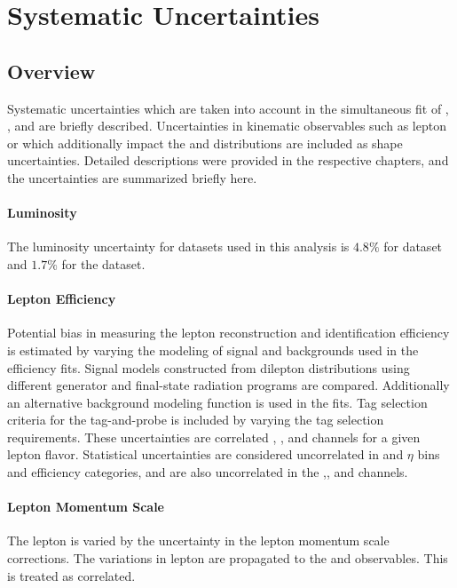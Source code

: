 \chapter{Systematic Uncertainties}\label{ch:systematics}

\section{Overview}
Systematic uncertainties which are taken into account in the simultaneous fit of \Wp, \Wm, and \Z are briefly described. Uncertainties in kinematic observables such as lepton \pt or \met which additionally impact the \mt and \mll distributions are included as shape uncertainties. Detailed descriptions were provided in the respective chapters, and the uncertainties are summarized briefly here.

\subsubsection{Luminosity}
The luminosity uncertainty for datasets used in this analysis is $4.8\%$ for \sg dataset and $1.7\%$ for the \sh dataset. 

\subsubsection{Lepton Efficiency}
Potential bias in measuring the lepton reconstruction and identification efficiency is estimated by varying the modeling of signal and backgrounds used in the efficiency  fits. Signal models constructed from dilepton \mll distributions using different generator and final-state radiation programs are compared. Additionally an alternative background modeling function is used in the fits. Tag selection criteria for the tag-and-probe is included by varying the tag selection requirements. These uncertainties are correlated \Wp, \Wm, and \Z channels for a given lepton flavor. Statistical uncertainties are considered uncorrelated in \pt and $\eta$ bins and efficiency categories, and are also uncorrelated in the \Wp,\Wm, and \Z channels.

\subsubsection{Lepton Momentum Scale}
The lepton \pt is varied by the uncertainty in the lepton momentum scale corrections. The variations in lepton \pt are propagated to the \mt and \mll observables. This is treated as correlated.

